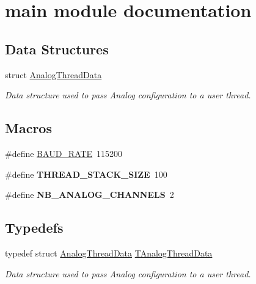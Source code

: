 \hypertarget{group__main__module}{}\section{main module documentation}
\label{group__main__module}
\subsection*{Data Structures}
\begin{DoxyCompactItemize}
\item 
struct \hyperlink{struct_analog_thread_data}{Analog\+Thread\+Data}
\begin{DoxyCompactList}\small\item\em Data structure used to pass Analog configuration to a user thread. \end{DoxyCompactList}\end{DoxyCompactItemize}
\subsection*{Macros}
\begin{DoxyCompactItemize}
\item 
\#define \hyperlink{group__main__module_gad4455691936f92fdd6c37566fc58ba1f}{B\+A\+U\+D\+\_\+\+R\+A\+T\+E}~115200
\item 
\hypertarget{group__main__module_ga90b7a8cb7bc3fdbd98014a3e15ee6e9a}{}\#define {\bfseries T\+H\+R\+E\+A\+D\+\_\+\+S\+T\+A\+C\+K\+\_\+\+S\+I\+Z\+E}~100\label{group__main__module_ga90b7a8cb7bc3fdbd98014a3e15ee6e9a}

\item 
\hypertarget{group__main__module_ga300da08cc989dc0963caf3a5afc024b8}{}\#define {\bfseries N\+B\+\_\+\+A\+N\+A\+L\+O\+G\+\_\+\+C\+H\+A\+N\+N\+E\+L\+S}~2\label{group__main__module_ga300da08cc989dc0963caf3a5afc024b8}

\end{DoxyCompactItemize}
\subsection*{Typedefs}
\begin{DoxyCompactItemize}
\item 
typedef struct \hyperlink{struct_analog_thread_data}{Analog\+Thread\+Data} \hyperlink{group__main__module_gae5f40603a116adc42529ceedda6942c7}{T\+Analog\+Thread\+Data}
\begin{DoxyCompactList}\small\item\em Data structure used to pass Analog configuration to a user thread. \end{DoxyCompactList}\end{DoxyCompactItemize}
